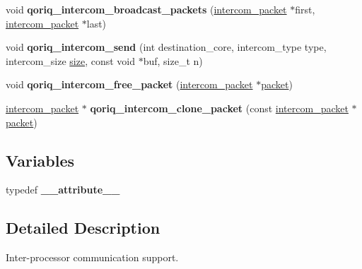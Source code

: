 \begin{DoxyCompactItemize}
\item 
\mbox{\label{group__QorIQInterCom_ga88efae6f804b667cdc7091b9d4c2d8df}} 
void {\bfseries qoriq\+\_\+intercom\+\_\+broadcast\+\_\+packets} (\mbox{\hyperlink{structintercom__packet}{intercom\+\_\+packet}} $\ast$first, \mbox{\hyperlink{structintercom__packet}{intercom\+\_\+packet}} $\ast$last)
\item 
\mbox{\label{group__QorIQInterCom_ga3e6eb5a3f779007941d043c5e1e924b3}} 
void {\bfseries qoriq\+\_\+intercom\+\_\+send} (int destination\+\_\+core, intercom\+\_\+type type, intercom\+\_\+size \mbox{\hyperlink{sun4u_2tte_8h_a245260f6f74972558f61b85227df5aae}{size}}, const void $\ast$buf, size\+\_\+t n)
\item 
\mbox{\label{group__QorIQInterCom_gaf5156cf56ebf247302f3fe755c2e880a}} 
void {\bfseries qoriq\+\_\+intercom\+\_\+free\+\_\+packet} (\mbox{\hyperlink{structintercom__packet}{intercom\+\_\+packet}} $\ast$\mbox{\hyperlink{structpacket}{packet}})
\item 
\mbox{\label{group__QorIQInterCom_ga29ece1efeefc6576d64f0dfb46205f59}} 
\mbox{\hyperlink{structintercom__packet}{intercom\+\_\+packet}} $\ast$ {\bfseries qoriq\+\_\+intercom\+\_\+clone\+\_\+packet} (const \mbox{\hyperlink{structintercom__packet}{intercom\+\_\+packet}} $\ast$\mbox{\hyperlink{structpacket}{packet}})
\end{DoxyCompactItemize}
\subsection*{Variables}
\begin{DoxyCompactItemize}
\item 
\mbox{\label{group__QorIQInterCom_gaeab68f17dc686a2f7dc72ab2b712e464}} 
typedef {\bfseries \+\_\+\+\_\+attribute\+\_\+\+\_\+}
\end{DoxyCompactItemize}


\subsection{Detailed Description}
Inter-\/processor communication support. 

